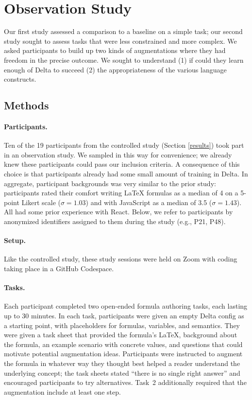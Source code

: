 \section{Observation Study}\label{observational}

Our first study assessed a comparison to a baseline on a simple task; our second study sought to assess tasks that were less constrained and more complex. We asked participants to build up two kinds of augmentations where they had freedom in the precise outcome. We sought to understand (1) if could they learn enough of Delta to succeed (2) the appropriateness of the various language constructs.

\subsection{Methods}

\paragraph{Participants.}
Ten of the 19 participants from the controlled study (Section \ref{results}) took part in an observation study. We sampled in this way for convenience; we already knew these participants could pass our inclusion criteria. A consequence of this choice is that participants already had some small amount of training in Delta. In aggregate, participant backgrounds was very similar to the prior study: participants rated their comfort writing LaTeX formulas as a median of 4 on a 5-point Likert scale ($\sigma = 1.03$) and with JavaScript as a median of 3.5 ($\sigma = 1.43$). All had some prior experience with React. Below, we refer to participants by anonymized identifiers assigned to them during the study (e.g., P21, P48).

\paragraph{Setup.} Like the controlled study, these study sessions were held on Zoom with coding taking place in a GitHub Codespace.

\paragraph{Tasks.}

Each participant completed two open-ended formula authoring tasks, each lasting up to 30 minutes. In each task, participants were given an empty Delta config as a starting point, with placeholders for formulas, variables, and semantics. They were given a task sheet that provided the formula's LaTeX, background about the formula, an example scenario with concrete values, and questions that could motivate potential augmentation ideas. Participants were instructed to augment the formula in whatever way they thought best helped a reader understand the underlying concept; the task sheets stated ``there is no single right answer'' and encouraged participants to try alternatives. Task~2 additionally required that the augmentation include at least one step.

